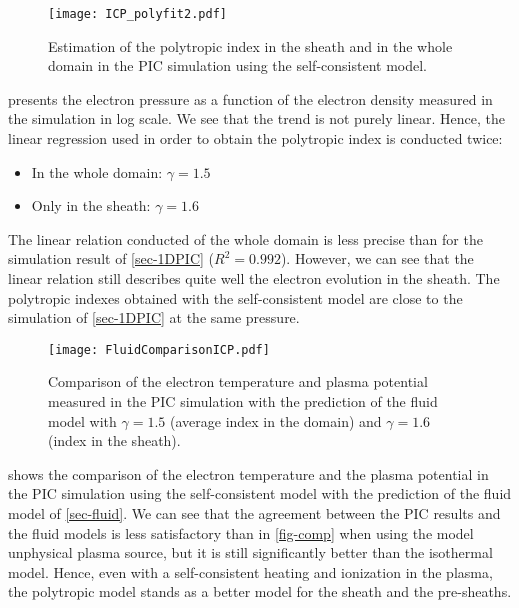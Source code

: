  \begin{figure}[!htbp]
    \centering
    \texttt{[image: ICP\_polyfit2.pdf]}
    \caption{Estimation of the polytropic index in the sheath and in the whole domain in the PIC simulation using the self-consistent model.}
    \label{fig-icpfit}
  \end{figure}

   presents the electron pressure as a function of the electron density measured in the simulation in log scale.
  We see that the trend is not purely linear. Hence, the linear regression used in order to obtain the polytropic index is conducted twice\string:
  \begin{itemize}
    \item In the whole domain\string: $\gamma=1.5$
    \item Only in the sheath\string: $\gamma=1.6$
  \end{itemize}
  The linear relation conducted of the whole domain is less precise than for the simulation result of \cref{sec-1DPIC} ($R^2=0.992$).
  However, we can see that the linear relation still describes quite well the electron evolution in the sheath.
  The polytropic indexes obtained with the self-consistent model are close to the simulation of \cref{sec-1DPIC} at the same pressure.

  \begin{figure}[!htbp]
    \centering
    \texttt{[image: FluidComparisonICP.pdf]}
    \caption{Comparison of the electron temperature and plasma potential measured in the PIC simulation with the prediction of the fluid model with $\gamma = 1.5$ (average index in the domain) and $\gamma=1.6$ (index in the sheath).}
    \label{fig-comp2}
  \end{figure}

   shows the comparison of the electron temperature and the plasma potential in the PIC simulation using the self-consistent model with the prediction of the fluid model of \cref{sec-fluid}.
  We can see that the agreement between the PIC results and the fluid models is less satisfactory than in \cref{fig-comp} when using the model unphysical plasma source, but it is still significantly better than the isothermal model.
  Hence, even with a self-consistent heating and ionization in the plasma, the polytropic model stands as a better model for the sheath and the pre-sheaths.
